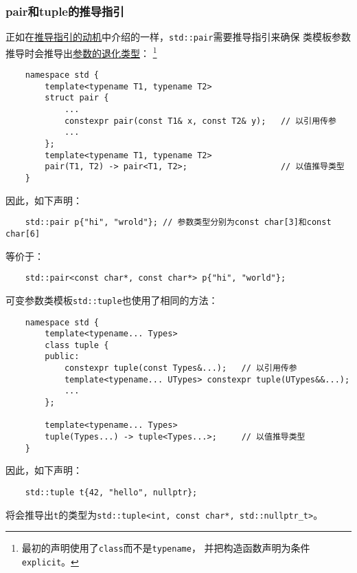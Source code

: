 \subsubsection{pair和tuple的推导指引}\label{ch9.2.6}
正如在\hyperref[ch9.1.4]{推导指引的动机}中介绍的一样，\texttt{std::pair}需要推导指引来确保
类模板参数推导时会推导出\hyperref[ch9.2.1]{参数的退化类型}：
\footnote{最初的声明使用了\texttt{class}而不是\texttt{typename}，
并把构造函数声明为条件\texttt{explicit}。}
\begin{lstlisting}
    namespace std {
        template<typename T1, typename T2>
        struct pair {
            ...
            constexpr pair(const T1& x, const T2& y);   // 以引用传参
            ...
        };
        template<typename T1, typename T2>
        pair(T1, T2) -> pair<T1, T2>;                   // 以值推导类型
    }
\end{lstlisting}
因此，如下声明：
\begin{lstlisting}
    std::pair p{"hi", "wrold"}; // 参数类型分别为const char[3]和const char[6]
\end{lstlisting}
等价于：
\begin{lstlisting}
    std::pair<const char*, const char*> p{"hi", "world"};
\end{lstlisting}
可变参数类模板\texttt{std::tuple}也使用了相同的方法：
\begin{lstlisting}
    namespace std {
        template<typename... Types>
        class tuple {
        public:
            constexpr tuple(const Types&...);   // 以引用传参
            template<typename... UTypes> constexpr tuple(UTypes&&...);
            ...
        };

        template<typename... Types>
        tuple(Types...) -> tuple<Types...>;     // 以值推导类型
    }
\end{lstlisting}
因此，如下声明：
\begin{lstlisting}
    std::tuple t{42, "hello", nullptr};
\end{lstlisting}
将会推导出\texttt{t}的类型为\texttt{std::tuple<int, const char*, std::nullptr\_t>}。

